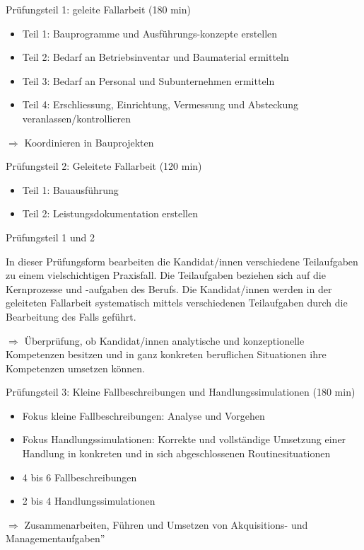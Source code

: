 \begin{frame}{Prüfungsteil 1: geleite Fallarbeit (180 min)}
    \begin{itemize}
        \item Teil 1: Bauprogramme und Ausführungs-konzepte erstellen
        \item Teil 2: Bedarf an Betriebsinventar und Baumaterial ermitteln
        \item Teil 3: Bedarf an Personal und Subunternehmen ermitteln
        \item Teil 4: Erschliessung, Einrichtung, Vermessung und Absteckung veranlassen/kontrollieren
    \end{itemize}
    \vspace{1em}
    $\Rightarrow$ Koordinieren in Bauprojekten
\end{frame}


\begin{frame}{Prüfungsteil 2: Geleitete Fallarbeit (120 min)}
    \begin{itemize}
        \item Teil 1: Bauausführung
        \item Teil 2: Leistungsdokumentation erstellen
    \end{itemize}
\end{frame}


\begin{frame}{Prüfungsteil 1 und 2}

\begin{myLernziele}
    In dieser Prüfungsform bearbeiten die Kandidat/innen verschiedene Teilaufgaben zu einem vielschichtigen Praxisfall. Die Teilaufgaben beziehen sich auf die Kernprozesse und -aufgaben des Berufs. Die Kandidat/innen werden in der geleiteten Fallarbeit systematisch mittels verschiedenen Teilaufgaben durch die Bearbeitung des Falls geführt.
    \vspace{1em}
    
    $\Rightarrow$ Überprüfung, ob Kandidat/innen analytische und konzeptionelle Kompetenzen besitzen und in ganz konkreten beruflichen Situationen ihre Kompetenzen umsetzen können.
\end{myLernziele}

\end{frame}

\begin{frame}{Prüfungsteil 3: Kleine Fallbeschreibungen und Handlungssimulationen (180 min)}
    \begin{itemize}
        \item Fokus kleine Fallbeschreibungen: Analyse und Vorgehen
        \item Fokus Handlungssimulationen: Korrekte und vollständige Umsetzung einer Handlung in konkreten und in sich abgeschlossenen Routinesituationen
        \item[\textbullet] 4 bis 6 Fallbeschreibungen
        \item[\textbullet] 2 bis 4 Handlungssimulationen
    \end{itemize}
        \vspace{1em}
    $\Rightarrow$ Zusammenarbeiten, Führen und Umsetzen von Akquisitions- und Managementaufgaben”
\end{frame}


